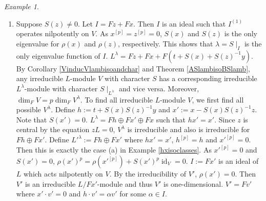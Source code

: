\documentclass[12pt,MSc]{muthesis_2023}
\theoremstyle{plain}%
\theoremstyle{definition}
\theoremstyle{remark}
\newtheorem{Example}[FactCounter]{Example} %
\DeclareMathOperator{\id}{id}
\begin{document}
\begin{Example}
\begin{enumerate}
\item[(b)] Suppose $S(z)\neq0$. Let $I=Fz+Fx$. Then $I$ is an ideal such that $I^{(1)}$ operates nilpotently on $V$. As $x^{[p]}=z^{[p]}=0$, $S(x)$ and $S(z)$ is the only eigenvalue for $\rho(x)$ and $\rho(z)$, respectively. This shows that $\lambda=S\mid_I$ is the only eigenvalue function of $I$. $L^{\lambda}=Fz+Fx+F(t+S(x)+{S(z)}^{-1}y)$. By Corollary \ref{VinducVlambisoandchar} and Theorem \ref{ASlambisoBSlamb}, any irreducible $L$-module $V$ with character $S$ has a corresponding irreducible $L^{\lambda}$-module with character $S\mid_{L^{\lambda}}$ and vice versa. Moreover, $\dim_FV=p\dim_FV^{\lambda}$. To find all irreducible $L$-module $V$, we first find all possible $V^{\lambda}$. Define $h:=t+S(x){S(z)}^{-1}y$ and $x':=x-S(x){S(z)}^{-1}z$. Note that $S(x')=0$. $L^{\lambda}=Fh\oplus Fx'\oplus Fx$ such that $hx'=x'$. Since $z$ is central by the equation $zL=0$, $V^{\lambda}$ is irreducible and also is irreducible for $Fh\oplus Fx'$. Define $L'^{\lambda}:= Fh\oplus Fx'$ where $hx'=x'$, $h^{[p]}=h$ and $x'^{[p]}=0$. Then this is exactly the case (a) in Example \ref{hxisoclasses}. As $x'^{[p]}=0$ and $S(x')=0$, ${\rho(x')}^p=\rho(x'^{[p]})+{S(x')}^p\id_V=0$. $I:=Fx'$ is an ideal of $L$ which acts nilpotently on $V$. By the irreducibility of $V'$, $\rho(x')=0$. Then $V'$ is an irreducible $L/Fx'$-module and thus $V'$ is one-dimensional. $V'=Fv'$ where $x' \cdot v'=0$ and $h\cdot v'=\alpha v'$ for some $\alpha\in I$.


\end{enumerate}
\end{Example}
\end{document}

